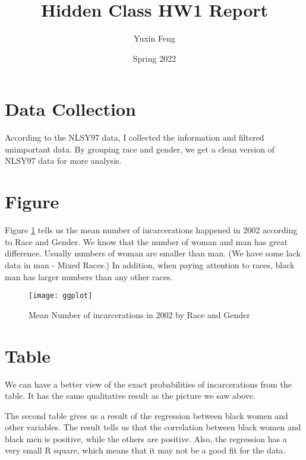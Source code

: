 \documentclass{article}
\author{Yuxin Feng}
\title{Hidden Class HW1 Report}
\date{Spring 2022}
\begin{document}
\maketitle

\section{Data Collection}

According to the NLSY97 data, I collected the information and filtered unimportant data. By grouping race and gender, we get a clean version of NLSY97 data for more analysis.

\section{Figure}
Figure \ref{fig:graph} tells us the mean number of incarcerations happened in 2002 according to Race and Gender. We know that the number of woman and man has great difference. Usually numbers of woman are smaller than man. (We have some lack data in man - Mixed Races.) In addition, when paying attention to races, black man has larger numbers than any other races.

\begin{figure}[H]
    \begin{center}
        \texttt{[image: ggplot]}
    \end{center}
    \caption{Mean Number of incarcerations in 2002 by Race and Gender}
    \label{fig:graph}
\end{figure}

\section{Table}
We can have a better view of the exact probabilities of incarcerations from the table. It has the same qualitative result as the picture we saw above.

The second table gives us a result of the regression between black women and other variables. The result tells us that the correlation between black women and black men is positive, while the others are positive. Also, the regression has a very small R square, which means that it may not be a good fit for the data.

\end{document}
